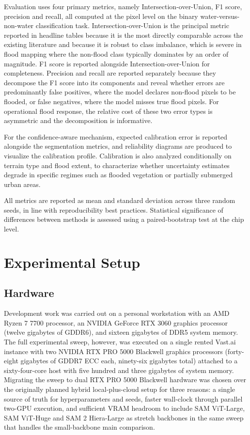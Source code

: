 \documentclass[11pt,a4paper,oneside]{report}
\begin{document}
Evaluation uses four primary metrics, namely Intersection-over-Union, F1 score, precision and recall, all computed at the pixel level on the binary water-versus-non-water classification task. Intersection-over-Union is the principal metric reported in headline tables because it is the most directly comparable across the existing literature and because it is robust to class imbalance, which is severe in flood mapping where the non-flood class typically dominates by an order of magnitude. F1 score is reported alongside Intersection-over-Union for completeness. Precision and recall are reported separately because they decompose the F1 score into its components and reveal whether errors are predominantly false positives, where the model declares non-flood pixels to be flooded, or false negatives, where the model misses true flood pixels. For operational flood response, the relative cost of these two error types is asymmetric and the decomposition is informative.

For the confidence-aware mechanism, expected calibration error is reported alongside the segmentation metrics, and reliability diagrams are produced to visualize the calibration profile. Calibration is also analyzed conditionally on terrain type and flood extent, to characterize whether uncertainty estimates degrade in specific regimes such as flooded vegetation or partially submerged urban areas.

All metrics are reported as mean and standard deviation across three random seeds, in line with reproducibility best practices. Statistical significance of differences between methods is assessed using a paired-bootstrap test at the chip level.

\chapter{Experimental Setup}
\label{chap:experimental}

\section{Hardware}

Development work was carried out on a personal workstation with an AMD Ryzen 7 7700 processor, an NVIDIA GeForce RTX 3060 graphics processor (twelve gigabytes of GDDR6), and sixteen gigabytes of DDR5 system memory. The full experimental sweep, however, was executed on a single rented Vast.ai instance with two NVIDIA RTX PRO 5000 Blackwell graphics processors (forty-eight gigabytes of GDDR7 ECC each, ninety-six gigabytes total) attached to a sixty-four-core host with five hundred and three gigabytes of system memory. Migrating the sweep to dual RTX PRO 5000 Blackwell hardware was chosen over the originally planned hybrid local-plus-cloud setup for three reasons: a single source of truth for hyperparameters and seeds, faster wall-clock through parallel two-GPU execution, and sufficient VRAM headroom to include SAM ViT-Large, SAM ViT-Huge and SAM 2 Hiera-Large as stretch backbones in the same sweep that handles the small-backbone main comparison.
\end{document}
